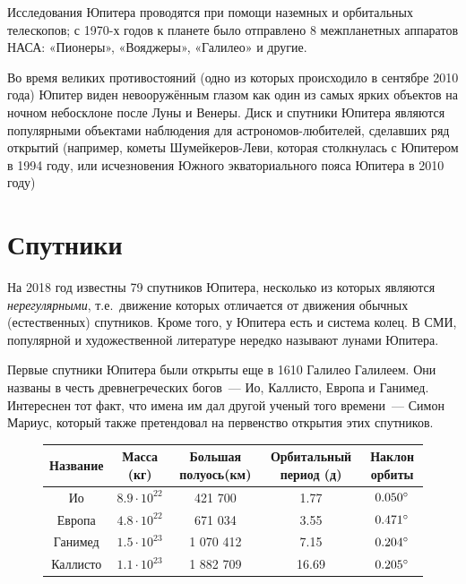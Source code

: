 \documentclass{article}
\begin{document}
	Исследования Юпитера проводятся при помощи наземных и орбитальных телескопов; с 1970-х годов к
	планете было отправлено 8 межпланетных аппаратов НАСА: «Пионеры», «Вояджеры», «Галилео» и другие.

	Во время великих противостояний (одно из которых происходило в сентябре 2010 года) Юпитер
	виден невооружённым глазом как один из самых ярких объектов на ночном небосклоне после Луны и
	Венеры. Диск и спутники Юпитера являются популярными объектами наблюдения для астрономов-любителей,
	сделавших ряд открытий (например, кометы Шумейкеров-Леви, которая столкнулась с Юпитером в 1994 
	году, или исчезновения Южного экваториального пояса Юпитера в 2010 году)
	\section{Спутники}	
	На 2018 год известны 79 спутников Юпитера, несколько из которых являются \textit{нерегулярными}, 
	т.е.~движение которых отличается от движения обычных (естественных) спутников. Кроме того, у Юпитера
	есть и система колец. В СМИ, популярной и художественной литературе нередко называют лунами Юпитера.
	
	Первые спутники Юпитера были открыты еще в 1610 Галилео Галилеем. Они названы в честь древнегреческих
	богов~--- Ио, Каллисто, Европа и Ганимед. Интереснен тот факт, что имена им дал другой ученый того
	времени~--- Симон Мариус, который также претендовал на первенство открытия этих спутников.
	\begin{figure}[h!]
	\begin{tabularx}{\textwidth}{|C|C|C|C|C|}
		\hline
		Название & Масса (кг) & Большая полуось(км) & Орбитальный период (д) & Наклон орбиты\\		
		\hline
		Ио & $8.9\cdot 10^{22}$ & 421 700 & 1.77 & $0.050\degree$\\
		\hline
		Европа & $4.8\cdot10^{22}$ & 671 034 & 3.55 & $0.471\degree$\\
		\hline
		Ганимед & $1.5\cdot10^{23}$ & 1 070 412 & 7.15 & $0.204\degree$\\
		\hline
		Каллисто & $1.1\cdot10^{23}$ & 1 882 709 & 16.69 & $0.205\degree$\\
		\hline
	\end{tabularx}
	\end{figure}
\end{document}
